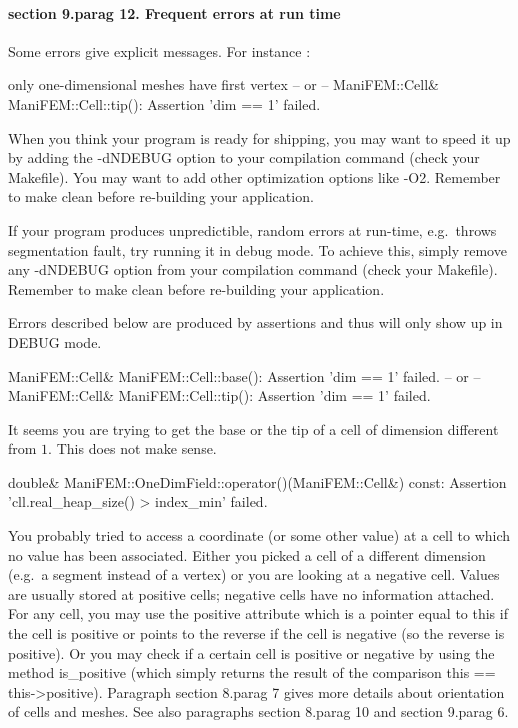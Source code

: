 \paragraph{\numb section 9.\numb parag 12. Frequent errors at run time}

Some errors give explicit messages. For instance :

\verbatim
only one-dimensional meshes have first vertex
-- or --
ManiFEM::Cell& ManiFEM::Cell::tip(): Assertion 'dim == 1' failed.
\endverbatim
\smallskip

When you think your program is ready for shipping, you may want to speed it up
by adding the {\codett -dNDEBUG} option to your compilation command
(check your {\codett Makefile}).
You may want to add other optimization options like {\codett -O2}.
Remember to {\codett make clean} before re-building your application.

If your program produces unpredictible, random errors at run-time, e.g.\ throws
{\codett segmentation fault}, try running it in debug mode.
To achieve this, simply remove any {\codett -dNDEBUG} option from your compilation
command (check your {\codett Makefile}).
Remember to {\codett make clean} before re-building your application.

Errors described below are produced by {\codett assert}ions and thus will
only show up in {\codett DEBUG} mode.

\smallskip\verbatim
ManiFEM::Cell& ManiFEM::Cell::base(): Assertion 'dim == 1' failed.
-- or --
ManiFEM::Cell& ManiFEM::Cell::tip(): Assertion 'dim == 1' failed.
\endverbatim

It seems you are trying to get the base or the tip of a cell of dimension
different from $1$.
This does not make sense.

\medskip\verbatim
double& ManiFEM::OneDimField::operator()(ManiFEM::Cell&) const:
Assertion 'cll.real_heap_size() > index_min' failed.
\endverbatim

You probably tried to access a coordinate (or some other value) at a cell to which 
no value has been associated.
Either you picked a cell of a different dimension (e.g.\ a segment instead of a
vertex) or you are looking at a negative cell.
Values are usually stored at positive cells; negative cells have no information attached.
For any cell, you may use the {\codett positive} attribute which is a pointer
equal to {\codett this} if the cell is positive or points to the reverse if
the cell is negative (so the reverse is positive).
Or you may check if a certain cell is positive or negative by using the method
{\codett is\_positive} (which simply returns the result of the comparison {\codett
this == this->positive}).
Paragraph \numb section 8.\numb parag 7 gives more details about orientation of
cells and meshes.
See also paragraphs \numb section 8.\numb parag 10 and \numb section 9.\numb parag 6.

